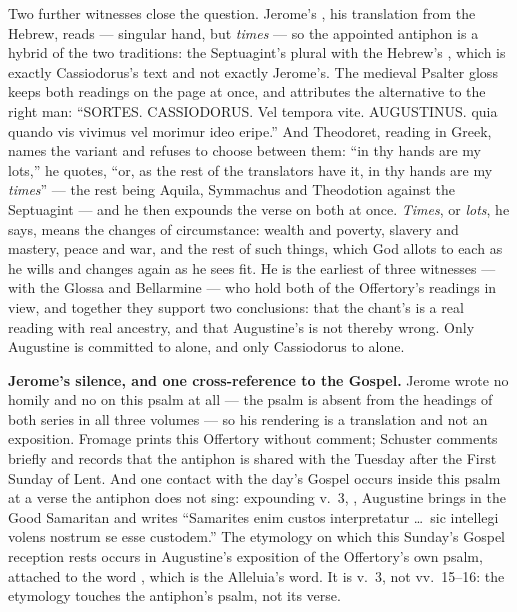 Two further witnesses close the question. Jerome's , his translation from the Hebrew, reads  --- singular hand, but \textit{times} --- so the appointed antiphon is a
hybrid of the two traditions: the Septuagint's plural 
with the Hebrew's , which is exactly Cassiodorus's text and not
exactly Jerome's. The medieval Psalter gloss keeps both readings on the page at
once, and attributes the alternative to the right man: ``SORTES. CASSIODORUS.
Vel tempora vite. AUGUSTINUS. quia quando vis vivimus vel morimur ideo eripe.''
And Theodoret, reading in Greek, names the variant and refuses to choose
between them: ``in thy hands are my lots,'' he quotes, ``or,
as the rest of the translators have it, in thy hands are my \emph{times}'' ---
the rest being Aquila, Symmachus and Theodotion against the Septuagint --- and
he then expounds the verse on both at once. \textit{Times}, or \textit{lots},
he says, means the changes of circumstance: wealth and poverty, slavery and
mastery, peace and war, and the rest of such things, which God allots to each
as he wills and changes again as he sees fit. He is the earliest of three witnesses ---
with the Glossa and Bellarmine --- who hold both of the Offertory's readings in
view, and together they support two conclusions: that the
chant's  is a real reading with real ancestry, and that
Augustine's  is not thereby wrong. Only Augustine is committed to
 alone, and only Cassiodorus to  alone.

\textbf{Jerome's silence, and one cross-reference to the Gospel.} Jerome wrote no homily
and no  on this psalm at all --- the psalm is absent
from the headings of both series in all three volumes ---
so his  rendering is a translation and not an exposition.
Fromage prints this Offertory without comment; Schuster comments briefly and
records that the antiphon is shared with the Tuesday after the First Sunday of
Lent. And one contact with the day's Gospel occurs inside this psalm at a verse
the antiphon does not sing: expounding v.~3, , Augustine brings in the Good Samaritan and writes ``Samarites enim
custos interpretatur \dots\ sic intellegi volens nostrum se esse custodem.''
The etymology on which this Sunday's Gospel reception rests occurs in
Augustine's exposition of the Offertory's own psalm, attached to the word
, which is the Alleluia's word. It is v.~3, not vv.~15--16:
the etymology touches the antiphon's psalm, not its verse.

